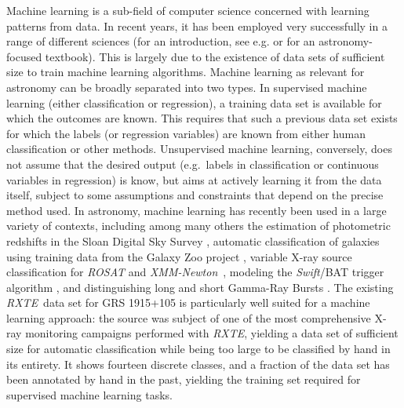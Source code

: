 \documentclass[12pt]{emulateapj}
\newcommand{\project}[1]{\textsl{#1}}
\newcommand{\rxte}{\project{RXTE}}
\newcommand{\xmm}{\project{XMM-Newton}}
\newcommand{\rosat}{\project{ROSAT}}
\newcommand{\swift}{\project{Swift}}
\begin{document}
Machine learning is a sub-field of computer science concerned with learning patterns from data. In recent years, it has been employed very successfully in a range of different sciences (for an introduction, see e.g. \citealt{bishop2006} or \citealt{ivezic2014} for an astronomy-focused textbook). This is largely due to the existence of data sets of sufficient size to train machine learning algorithms. Machine learning as relevant for astronomy can be broadly separated into two types. In supervised machine learning (either classification or regression), a training data set is available for which the outcomes are known. This requires that such a previous data set exists for which the labels (or regression variables) are known from either human classification or other methods. %
Unsupervised machine learning, conversely, does not assume that the desired output (e.g.\ labels in classification or continuous variables in regression) is know, but aims at actively learning it from the data itself, subject to some assumptions and constraints that depend on the precise method used. In astronomy, machine learning has recently been used in a large variety of contexts, including among many others the estimation of photometric redshifts in the Sloan Digital Sky Survey \citep{carliles2010, beck2016}, automatic classification of galaxies using training data from the Galaxy Zoo project \citep{banerji2010}, variable X-ray source classification for \rosat \citep{mcglynn2004} and \xmm\ \citep{farrell2015}, modeling the \swift/BAT trigger algorithm \citep{graff2015}, and distinguishing long and short Gamma-Ray Bursts \citep{tarnopolski2015}.
The existing \rxte\ data set for GRS 1915+105 is particularly well suited for a machine learning approach: the source was subject of one of the most comprehensive X-ray monitoring campaigns performed with \rxte, yielding a data set of sufficient size for automatic classification while being too large to be classified by hand in its entirety. It shows fourteen discrete classes, and a fraction of the data set has been annotated by hand in the past, yielding the training set required for supervised machine learning tasks.
\end{document}

